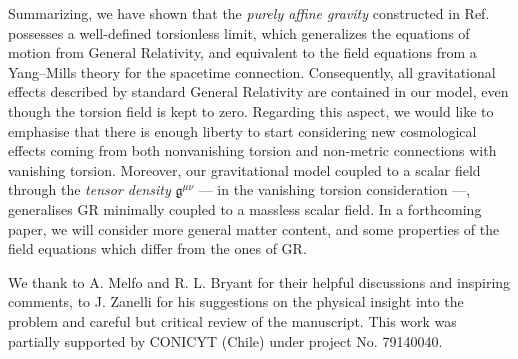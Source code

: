 \documentclass[aps,prl,twocolumn,superscriptaddress,showpacs,showkeys]{revtex4-1}
\begin{document}
Summarizing, we have shown that the  \emph{purely affine gravity} constructed in Ref.~\cite{Skirzewski:2014eta} possesses a well-defined torsionless limit, which generalizes the equations of motion  from General Relativity, and equivalent to the field equations from a Yang--Mills theory for the spacetime connection. Consequently, all gravitational effects described by standard General Relativity are contained in our model, even though the torsion field is kept to zero. Regarding this aspect, we would like to emphasise that there is enough liberty to start considering new cosmological effects coming from both nonvanishing torsion and non-metric connections with vanishing torsion.
Moreover, our gravitational model coupled to a scalar field through the \emph{tensor density} $\mathfrak{g}^{\mu\nu}$ --- in the vanishing torsion consideration ---, generalises GR minimally coupled to a massless scalar field. In a forthcoming paper, we will consider more general matter content, and some properties of the field equations which differ from the ones of GR.%

\begin{acknowledgments}
  We thank to A. Melfo and R. L. Bryant for their helpful discussions and inspiring comments, to J. Zanelli for his suggestions on the physical insight into the problem and careful but critical review of the manuscript.
  This work was partially supported by CONICYT (Chile) under project No. 79140040.
\end{acknowledgments}



\end{document}
